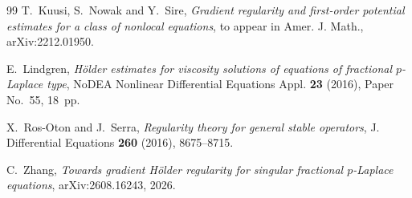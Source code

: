 \documentclass[11pt,reqno]{amsart}
\numberwithin{equation}{section}
\theoremstyle{remark}
\begin{document}
\begin{thebibliography}{99}
T.~Kuusi, S.~Nowak and Y.~Sire,
\emph{Gradient regularity and first-order potential estimates for a class
of nonlocal equations},
to appear in Amer. J. Math., arXiv:2212.01950.

E.~Lindgren,
\emph{H\"older estimates for viscosity solutions of equations of
fractional $p$-Laplace type},
NoDEA Nonlinear Differential Equations Appl. \textbf{23} (2016),
Paper No.~55, 18~pp.

X.~Ros-Oton and J.~Serra,
\emph{Regularity theory for general stable operators},
J. Differential Equations \textbf{260} (2016), 8675--8715.

C.~Zhang,
\emph{Towards gradient H\"older regularity for singular fractional
$p$-Laplace equations},
arXiv:2608.16243, 2026.

\end{thebibliography}
\end{document}
